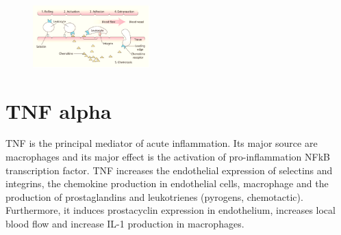 \begin{figure}[ht]
\centering
\includegraphics[width=0.4\textwidth]{leuko}
\caption{\label{fig:leuko}}
\end{figure}

\section{TNF alpha}
TNF is the principal mediator of acute inflammation.
Its major source are macrophages and its major effect is the activation of pro-inflammation NFkB transcription factor.
TNF increases the endothelial expression of selectins and integrins, the chemokine production in endothelial cells, macrophage and the production of prostaglandins and leukotrienes (pyrogens, chemotactic).
Furthermore, it induces prostacyclin expression in endothelium, increases local blood flow and increase IL-1 production in macrophages.

